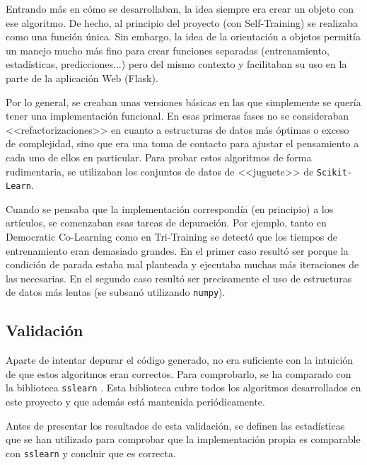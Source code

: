 Entrando más en cómo se desarrollaban, la idea siempre era crear un objeto con
ese algoritmo. De hecho, al principio del proyecto (con Self-Training) se
realizaba como una función única. Sin embargo, la idea de la orientación a
objetos permitía un manejo mucho más fino para crear funciones separadas
(entrenamiento, estadísticas, predicciones...) pero del mismo contexto y
facilitaban su uso en la parte de la aplicación Web (Flask).

Por lo general, se creaban unas versiones básicas en las que simplemente se
quería tener una implementación funcional. En esas primeras fases no se
consideraban <<refactorizaciones>> en cuanto a estructuras de datos más óptimas
o exceso de complejidad, sino que era una toma de contacto para ajustar el
pensamiento a cada uno de ellos en particular. Para probar estos algoritmos de
forma rudimentaria, se utilizaban los conjuntos de datos de <<juguete>> de
\texttt{Scikit-Learn}.

Cuando se pensaba que la implementación correspondía (en principio) a los
artículos, se comenzaban esas tareas de depuración. Por ejemplo, tanto en
Democratic Co-Learning como en Tri-Training se detectó que los tiempos de
entrenamiento eran demasiado grandes. En el primer caso resultó ser porque la
condición de parada estaba mal planteada y ejecutaba muchas más iteraciones de
las necesarias. En el segundo caso resultó ser precisamente el uso de
estructuras de datos más lentas (se subsanó utilizando \texttt{numpy}).

\subsection{Validación}

Aparte de intentar depurar el código generado, no era suficiente con la
intuición de que estos algoritmos eran correctos. Para comprobarlo, se ha
comparado con la biblioteca \texttt{sslearn}
\cite{jose_luis_garrido_labrador_2023_7781117}. Esta biblioteca cubre todos los
algoritmos desarrollados en este proyecto y que además está mantenida
periódicamente.

Antes de presentar los resultados de esta validación, se definen las
estadísticas que se han utilizado para comprobar que la implementación propia es
comparable con \texttt{sslearn} y concluir que es correcta.

